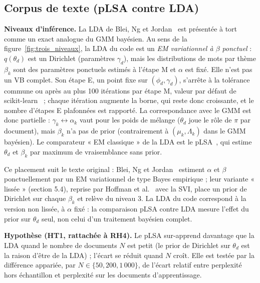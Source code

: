\subsection{Corpus de texte (pLSA contre LDA)}\label{sec:texte_methodo}
\textbf{Niveaux d'inférence. }La LDA de Blei, Ng et Jordan~\cite{blei2003} est présentée à tort comme un exact analogue du GMM bayésien. Au sens de la figure~\ref{fig:trois_niveaux}, la LDA du code est un \emph{EM variationnel à $\beta$ ponctuel} : $q(\theta_d)$ est un Dirichlet (paramètres $\gamma_d$), mais les distributions de mots par thème $\beta_k$ sont des paramètres ponctuels estimés à l'étape M et $\alpha$ est fixé. Elle n'est pas un VB complet. Son étape E, un point fixe sur $(\phi_d, \gamma_d)$, s'arrête à la tolérance commune ou après au plus 100 itérations par étape M, valeur par défaut de scikit-learn~\cite{pedregosa2011} ; chaque itération augmente la borne, qui reste donc croissante, et le nombre d'étapes E plafonnées est rapporté. La correspondance avec le GMM est donc partielle : $\gamma_k \leftrightarrow \alpha_k$ vaut pour les poids de mélange ($\theta_d$ joue le rôle de $\pi$ par document), mais $\beta_k$ n'a pas de prior (contrairement à $(\mu_k,\Lambda_k)$ dans le GMM bayésien). Le comparateur « EM classique » de la LDA est le pLSA~\cite{hofmann1999}, qui estime $\theta_d$ et $\beta_k$ par maximum de vraisemblance sans prior.

Ce placement suit le texte original : Blei, Ng et Jordan~\cite[section~5.3]{blei2003} estiment $\alpha$ et $\beta$ ponctuellement par un EM variationnel de type Bayes empirique ; leur variante « lissée » (section 5.4), reprise par Hoffman et al.~\cite{hoffman2013} avec la SVI, place un prior de Dirichlet sur chaque $\beta_k$ et relève du niveau 3. La LDA du code correspond à la version non lissée, à $\alpha$ fixé : la comparaison pLSA contre LDA mesure l'effet du prior sur $\theta_d$ seul, non celui d'un traitement bayésien complet.



\textbf{Hypothèse (HT1, rattachée à RH4). }Le pLSA sur-apprend davantage que la LDA quand le nombre de documents $N$ est petit (le prior de Dirichlet sur $\theta_d$ est la raison d'être de la LDA) ; l'écart se réduit quand $N$ croît. Elle est testée par la différence appariée, par $N \in \{50, 200, 1\,000\}$, de l'écart relatif entre perplexité hors échantillon et perplexité sur les documents d'apprentissage.

